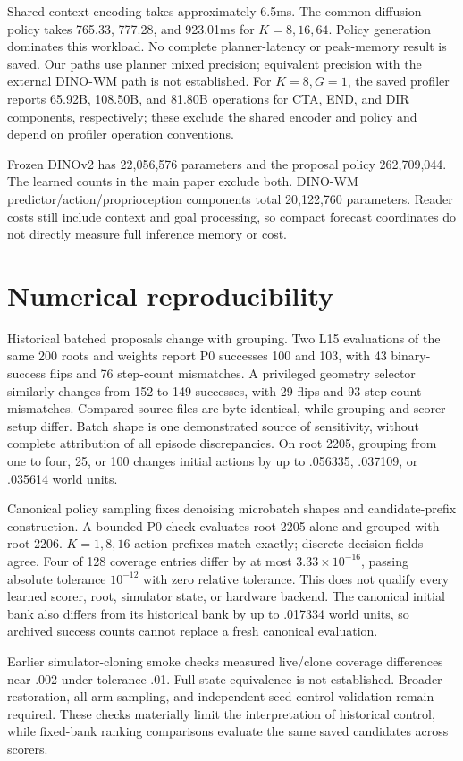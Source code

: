 \documentclass[10pt,twocolumn,letterpaper]{article}
\begin{document}
Shared context encoding takes approximately 6.5ms. The common diffusion policy takes 765.33, 777.28, and 923.01ms for $K=8,16,64$. Policy generation dominates this workload. No complete planner-latency or peak-memory result is saved. Our paths use planner mixed precision; equivalent precision with the external DINO-WM path is not established. For $K=8,G=1$, the saved profiler reports 65.92B, 108.50B, and 81.80B operations for CTA, END, and DIR components, respectively; these exclude the shared encoder and policy and depend on profiler operation conventions.

Frozen DINOv2 has 22,056,576 parameters and the proposal policy 262,709,044. The learned counts in the main paper exclude both. DINO-WM predictor/action/proprioception components total 20,122,760 parameters. Reader costs still include context and goal processing, so compact forecast coordinates do not directly measure full inference memory or cost.

\section{Numerical reproducibility}
Historical batched proposals change with grouping. Two L15 evaluations of the same 200 roots and weights report P0 successes 100 and 103, with 43 binary-success flips and 76 step-count mismatches. A privileged geometry selector similarly changes from 152 to 149 successes, with 29 flips and 93 step-count mismatches. Compared source files are byte-identical, while grouping and scorer setup differ. Batch shape is one demonstrated source of sensitivity, without complete attribution of all episode discrepancies. On root 2205, grouping from one to four, 25, or 100 changes initial actions by up to .056335, .037109, or .035614 world units.

Canonical policy sampling fixes denoising microbatch shapes and candidate-prefix construction. A bounded P0 check evaluates root 2205 alone and grouped with root 2206. $K=1,8,16$ action prefixes match exactly; discrete decision fields agree. Four of 128 coverage entries differ by at most $3.33\times10^{-16}$, passing absolute tolerance $10^{-12}$ with zero relative tolerance. This does not qualify every learned scorer, root, simulator state, or hardware backend. The canonical initial bank also differs from its historical bank by up to .017334 world units, so archived success counts cannot replace a fresh canonical evaluation.

Earlier simulator-cloning smoke checks measured live/clone coverage differences near .002 under tolerance .01. Full-state equivalence is not established. Broader restoration, all-arm sampling, and independent-seed control validation remain required. These checks materially limit the interpretation of historical control, while fixed-bank ranking comparisons evaluate the same saved candidates across scorers.
\end{document}
